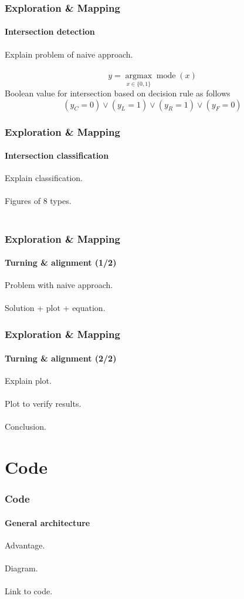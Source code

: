 \documentclass{beamer}
\begin{document}

\begin{frame}
\frametitle{Exploration \& Mapping}
\framesubtitle{Intersection detection}
Explain problem of naive approach.\\~\\
$$
y = \underset{x \in  \{0,1\}}{\operatorname{argmax}} \operatorname{mode}(x)
$$
Boolean value for intersection based on decision rule as follows
$$
(y_C = 0) \lor (y_L = 1) \lor (y_R = 1) \lor (y_F = 0) 
$$
\end{frame}


\begin{frame}
\frametitle{Exploration \& Mapping}
\framesubtitle{Intersection classification}
Explain classification.\\~\\
Figures of 8 types.\\~\\
\end{frame}


\begin{frame}
\frametitle{Exploration \& Mapping}
\framesubtitle{Turning \& alignment (1/2)}
Problem with naive approach.\\~\\
Solution + plot + equation.
\end{frame}


\begin{frame}
\frametitle{Exploration \& Mapping}
\framesubtitle{Turning \& alignment (2/2)}
Explain plot.\\~\\
Plot to verify results.\\~\\
Conclusion.
\end{frame}

\section{Code} 

\begin{frame}
\frametitle{Code}
\framesubtitle{General architecture}
Advantage.\\~\\
Diagram.\\~\\
Link to code.\\~\\
\end{frame}
\end{document}
